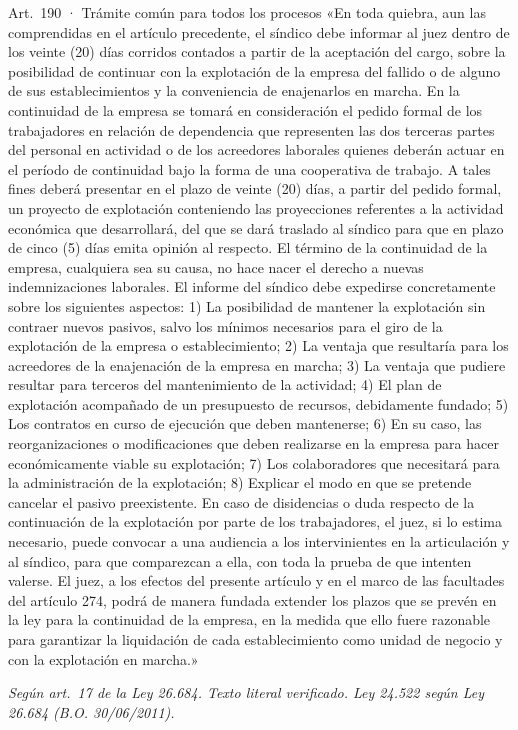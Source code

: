 \documentclass[12pt,oneside]{book}
\begin{document}
\begin{norma}{Art.~190 · Trámite común para todos los procesos}
«En toda quiebra, aun las comprendidas en el artículo precedente, el síndico debe informar al juez dentro de los veinte (20) días corridos contados a partir de la aceptación del cargo, sobre la posibilidad de continuar con la explotación de la empresa del fallido o de alguno de sus establecimientos y la conveniencia de enajenarlos en marcha. En la continuidad de la empresa se tomará en consideración el pedido formal de los trabajadores en relación de dependencia que representen las dos terceras partes del personal en actividad o de los acreedores laborales quienes deberán actuar en el período de continuidad bajo la forma de una cooperativa de trabajo. A tales fines deberá presentar en el plazo de veinte (20) días, a partir del pedido formal, un proyecto de explotación conteniendo las proyecciones referentes a la actividad económica que desarrollará, del que se dará traslado al síndico para que en plazo de cinco (5) días emita opinión al respecto. El término de la continuidad de la empresa, cualquiera sea su causa, no hace nacer el derecho a nuevas indemnizaciones laborales. El informe del síndico debe expedirse concretamente sobre los siguientes aspectos: 1) La posibilidad de mantener la explotación sin contraer nuevos pasivos, salvo los mínimos necesarios para el giro de la explotación de la empresa o establecimiento; 2) La ventaja que resultaría para los acreedores de la enajenación de la empresa en marcha; 3) La ventaja que pudiere resultar para terceros del mantenimiento de la actividad; 4) El plan de explotación acompañado de un presupuesto de recursos, debidamente fundado; 5) Los contratos en curso de ejecución que deben mantenerse; 6) En su caso, las reorganizaciones o modificaciones que deben realizarse en la empresa para hacer económicamente viable su explotación; 7) Los colaboradores que necesitará para la administración de la explotación; 8) Explicar el modo en que se pretende cancelar el pasivo preexistente. En caso de disidencias o duda respecto de la continuación de la explotación por parte de los trabajadores, el juez, si lo estima necesario, puede convocar a una audiencia a los intervinientes en la articulación y al síndico, para que comparezcan a ella, con toda la prueba de que intenten valerse. El juez, a los efectos del presente artículo y en el marco de las facultades del artículo 274, podrá de manera fundada extender los plazos que se prevén en la ley para la continuidad de la empresa, en la medida que ello fuere razonable para garantizar la liquidación de cada establecimiento como unidad de negocio y con la explotación en marcha.»

\par\smallskip\textit{Según art.~17 de la Ley 26.684. Texto literal verificado. Ley 24.522 según Ley 26.684 (B.O. 30/06/2011).}
\end{norma}
\end{document}
